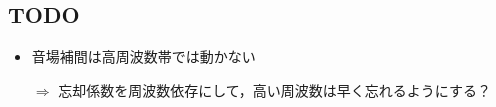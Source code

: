 \documentclass[twocolumn,9pt,dvipdfmx]{article}
\begin{document}
\subsection*{TODO}
\begin{itemize}
  \item 音場補間は高周波数帯では動かない
  \item[$\Rightarrow$] 忘却係数を周波数依存にして，高い周波数は早く忘れるようにする？
\end{itemize}
\end{document}

